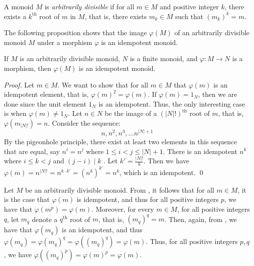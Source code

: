 \documentclass{llncs}
\begin{document}
\begin{definition}
    A monoid $M$ is \emph{arbitrarily divisible} if for all $m \in M$ and positive integer $k$, there exists a \(k^{\text{th}}\) root of \(m\) in \(M\), that is, there exists $m_k \in M$ such that $(m_k)^k = m$.
  \label{def:arbitrarily-divisible}
\end{definition}

The following proposition shows that the image \(\varphi(M)\) of an arbitrarily divisible monoid \(M\) under a morphism \(\varphi\) 
is an idempotent monoid.
\begin{proposition}
	If $M$ is an arbitrarily divisible monoid, $N$ is a finite monoid, and $\varphi: M\to N$ is a morphism, then \(\varphi(M)\) is an idempotent monoid.
\label{prop:arbitrarily-divisible-monoid}
\end{proposition}

\begin{proof}
  Let $m \in M$. 
  We want to show that for all \(m \in M\) that \(\varphi(m)\) is an idempotent element, that is, \(\varphi(m)^2 = \varphi(m)\).
  If \(\varphi(m) = 1_N\), then we are done since the unit element \(1_N\) is an idempotent.
  Thus, the only interesting case is when $\varphi(m) \neq 1_N$.
  Let \(n \in N\) be the image of a $(|N|!)^{\text{th}}$ root of \(m\), that is, $\varphi\left(m_{|N|!}\right) = n$. Consider the sequence:
  \begin{equation*}
    n, n^2, n^3, \ldots n^{|N| + 1}
  \end{equation*}
  By the pigeonhole principle, there exist at least two elements in this sequence that are equal, say $n^i = n^j$ where $1 \le i < j \le |N|+1$. There is an idempotent $n^k$ where $i \le k < j$ and $(j-i) \mid k$ \cite{eilenberg1974automata}. Let $k' = \frac{|N|!}{k}$. Then we have $\varphi(m) = n^{|N|!} = n^{k \cdot k'} = (n^k)^{k'} = n^k$, which is an idempotent.
  \qed
\end{proof}

\begin{remark}
  Let $M$ be an arbitrarily divisible monoid. 
  From , 
  it follows that for all \(m \in M\), it is the case that \(\varphi(m)\) is idempotent, and thus for all 
  positive integers $p$, we have that $ \varphi(m^p) = \varphi(m)$. 
  Moreover, for every $m \in M$, for all positive integers $q$, let $m_q$ denote a \(q^{\text{th}}\) root of \(m\), that is, $(m_q)^q = m$. 
  Then, again, from , we have that $\varphi(m_q)$ is an idempotent, and thus $\varphi(m_q) = \varphi(m_q)^q = \varphi((m_q)^q) = \varphi(m)$. 
  Thus, for all positive integers $p, q$, we have $ \varphi((m_q)^p) = \varphi(m)^p = \varphi(m)$.
\label{rem:arbitrarily-divisible-monoid-rationals}
\end{remark}
\end{document}
